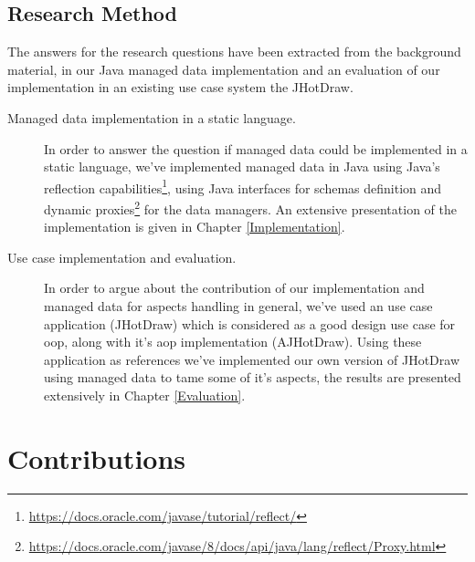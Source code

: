 \subsection{Research Method}\label{Research Method}
The answers for the research questions have been extracted from the background material, in our Java managed data implementation and an evaluation of our implementation in an existing use case system the JHotDraw.

\begin{description}

  \item[Managed data implementation in a static language.]
  In order to answer the question if managed data could be implemented in a static language, we've implemented managed data in Java 
  using Java's reflection capabilities\footnote{\url{https://docs.oracle.com/javase/tutorial/reflect/}}, using Java interfaces 
  for schemas definition and dynamic proxies\footnote{\url{https://docs.oracle.com/javase/8/docs/api/java/lang/reflect/Proxy.html}}
  for the data managers. An extensive presentation of the implementation is given in Chapter \ref{Implementation}.

  \item[Use case implementation and evaluation.] In order to argue about the contribution of our implementation and managed data for aspects handling in general, we've used an use case application (JHotDraw) which is considered as a good design use case for \ac{oop}, along with it's \ac{aop} implementation (AJHotDraw). Using these application as references we've implemented our own version of JHotDraw using managed data to tame some of it's aspects, the results are presented extensively in Chapter \ref{Evaluation}.

\end{description}	

\section{Contributions}\label{Contributions}


